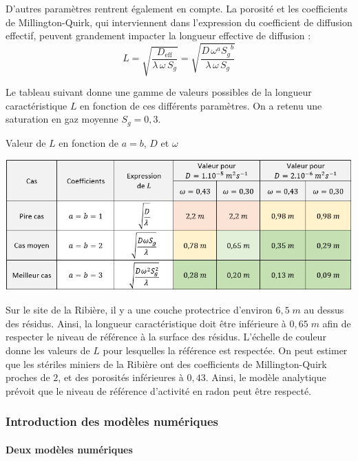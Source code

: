 \documentclass{article}
\begin{document}
D'autres paramètres rentrent également en compte. La porosité et les coefficients de Millington-Quirk, qui interviennent dans l’expression du coefficient de diffusion effectif, peuvent grandement impacter la longueur effective de diffusion :
$$
L=\sqrt{\frac{D_{\text{eff}}}{\lambda \,\omega\, S_g }}=\sqrt{\frac{D \,\omega^a {S_g}^b}{\lambda\, \omega \,S_g }}
$$

Le tableau suivant donne une gamme de valeurs possibles de la longueur caractéristique $L$ en fonction de ces différents paramètres. On a retenu une saturation en gaz moyenne $S_g=0,3$.

\begin{table}[H]
    \centering
    \caption{Valeur de $L$ en fonction de $a=b$, $D$ et $\omega$}
    \includegraphics[width = \linewidth]{III_C_9.png}

    \label{tab:sens_mq_poro}
\end{table}

Sur le site de la Ribière, il y a une couche protectrice d'environ $6,5\;m$ au dessus des résidus. Ainsi, la longueur caractéristique doit être inférieure à $0,65\;m$ afin de respecter le niveau de référence à la surface des résidus. L'échelle de couleur donne les valeurs de $L$ pour lesquelles la référence est respectée. On peut estimer que les stériles miniers de la Ribière ont des coefficients de Millington-Quirk proches de $2$, et des porosités inférieures à $0,43$. Ainsi, le modèle analytique prévoit que le niveau de référence d'activité en radon peut être respecté.


\subsubsection{Introduction des modèles numériques}

\paragraph{Deux modèles numériques}
\end{document}
